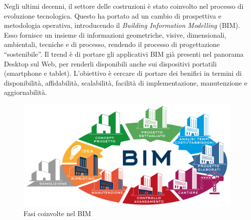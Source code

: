 Negli ultimi decenni, il settore delle costruzioni è stato coinvolto nel processo di evoluzione tecnologica.
Questo ha portato ad un cambio di prospettiva e metodologia operativa, introducendo il \emph{Building Information Modelling} (BIM).
Esso fornisce un insieme di informazioni geometriche, visive, dimensionali, ambientali, tecniche e di processo, rendendo
il processo di progettazione ``sostenibile''.
Il trend è di portare gli applicativi BIM già presenti nel panorama Desktop sul Web, per renderli disponibili anche
sui dispositivi portatili (smartphone e tablet). L'obiettivo è cercare di portare dei benifici in termini di disponibilità, affidabilità,
scalabilità, facilità di implementazione, manutenzione e aggiornabilità.

\begin{figure}[htbp] %
   \centering
   \includegraphics[width=1\linewidth]{images/bim}
   \caption{Fasi coinvolte nel BIM}
   \label{fig:bim}
\end{figure}
\newpage
